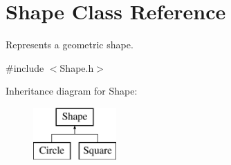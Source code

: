 \hypertarget{class_shape}{}\section{Shape Class Reference}
\label{class_shape}


Represents a geometric shape.  




{\ttfamily \#include $<$Shape.\+h$>$}

Inheritance diagram for Shape\+:\begin{figure}[H]
\begin{center}
\leavevmode
\includegraphics[height=2.000000cm]{class_shape}
\end{center}
\end{figure}
